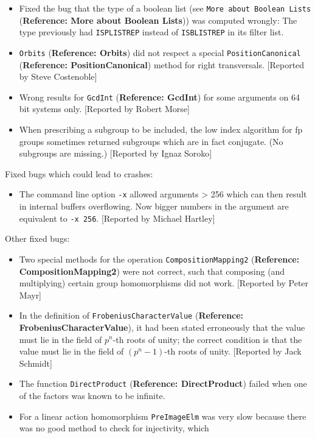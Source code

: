 \documentclass[a4paper,11pt]{report}
\begin{document}
{{\begin{itemize}
\item  Fixed the bug that the type of a boolean list (see \texttt{More about Boolean Lists} (\textbf{Reference: More about Boolean Lists})) was computed wrongly: The type previously had \texttt{IS{\textunderscore}PLIST{\textunderscore}REP} instead of \texttt{IS{\textunderscore}BLIST{\textunderscore}REP} in its filter list. 
\item  \texttt{Orbits} (\textbf{Reference: Orbits}) did not respect a special \texttt{PositionCanonical} (\textbf{Reference: PositionCanonical}) method for right transversals. [Reported by Steve Costenoble] 
\item  Wrong results for \texttt{GcdInt} (\textbf{Reference: GcdInt}) for some arguments on 64 bit systems only. [Reported by Robert Morse] 
\item  When prescribing a subgroup to be included, the low index algorithm for fp
groups sometimes returned subgroups which are in fact conjugate. (No subgroups
are missing.) [Reported by Ignaz Soroko] 
\end{itemize}
 Fixed bugs which could lead to crashes: 
\begin{itemize}
\item  The command line option \texttt{-x} allowed arguments {\textgreater} 256 which can then result in internal buffers
overflowing. Now bigger numbers in the argument are equivalent to \texttt{-x 256}.  [Reported by Michael Hartley] 
\end{itemize}
 Other fixed bugs: 
\begin{itemize}
\item  Two special methods for the operation \texttt{CompositionMapping2} (\textbf{Reference: CompositionMapping2}) were not correct, such that composing (and multiplying) certain group
homomorphisms did not work. [Reported by Peter Mayr] 
\item  In the definition of \texttt{FrobeniusCharacterValue} (\textbf{Reference: FrobeniusCharacterValue}), it had been stated erroneously that the value must lie in the field of $p^n$-th roots of unity; the correct condition is that the value must lie in the
field of $(p^n-1)$-th roots of unity. [Reported by Jack Schmidt] 
\item  The function \texttt{DirectProduct} (\textbf{Reference: DirectProduct}) failed when one of the factors was known to be infinite. 
\item  For a linear action homomorphism \texttt{PreImageElm} was very slow because there was no good method to check for injectivity, which

\end{itemize}}}
\end{document}
